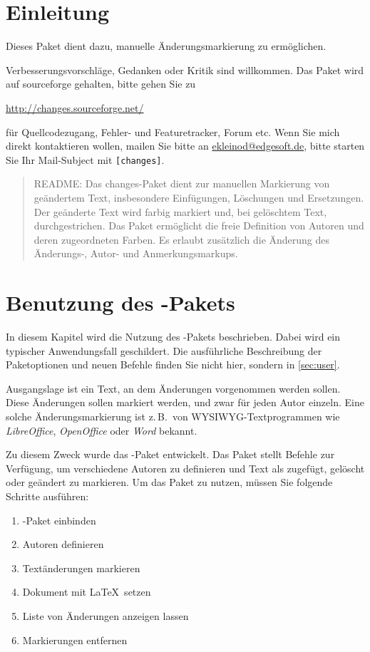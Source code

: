 \section{Einleitung}

Dieses Paket dient dazu, manuelle Änderungsmarkierung zu ermöglichen.

Verbesserungsvorschläge, Gedanken oder Kritik sind willkommen.
Das Paket wird auf sourceforge gehalten, bitte gehen Sie zu

\url{http://changes.sourceforge.net/}

für Quellcodezugang, Fehler- und Featuretracker, Forum etc.
Wenn Sie mich direkt kontaktieren wollen, mailen Sie bitte an \href{mailto:ekleinod@edgesoft.de}{ekleinod@edgesoft.de}, bitte starten Sie Ihr Mail-Subject mit \texttt{[changes]}.

\begin{quote}
	\small\textsc{README:}
	Das changes-Paket dient zur manuellen Markierung von geändertem Text, insbesondere Einfügungen, Löschungen und Ersetzungen.
	Der geänderte Text wird farbig markiert und, bei gelöschtem Text, durchgestrichen.
	Das Paket ermöglicht die freie Definition von Autoren und deren zugeordneten Farben.
	Es erlaubt zusätzlich die Änderung des Änderungs-, Autor- und Anmerkungsmarkups.
\end{quote}

\section{Benutzung des -Pakets}
\label{sec:usage}

In diesem Kapitel wird die Nutzung des -Pakets beschrieben.
Dabei wird ein typischer Anwendungsfall geschildert.
Die ausführliche Beschreibung der Paketoptionen und neuen Befehle finden Sie nicht hier, sondern in \autoref{sec:user}.

Ausgangslage ist ein Text, an dem Änderungen vorgenommen werden sollen.
Diese Änderungen sollen markiert werden, und zwar für jeden Autor einzeln.
Eine solche Änderungsmarkierung ist z.\,B.\ von WYSIWYG-Textprogrammen wie \emph{LibreOffice}, \emph{OpenOffice} oder \emph{Word} bekannt.

Zu diesem Zweck wurde das -Paket entwickelt.
Das Paket stellt Befehle zur Verfügung, um verschiedene Autoren zu definieren und Text als zugefügt, gelöscht oder geändert zu markieren.
Um das Paket zu nutzen, müssen Sie folgende Schritte ausführen:
\begin{enumerate}
	\item {}-Paket einbinden
	\item Autoren definieren
	\item Textänderungen markieren
	\item Dokument mit \LaTeX\ setzen
	\item Liste von Änderungen anzeigen lassen
	\item Markierungen entfernen
\end{enumerate}

